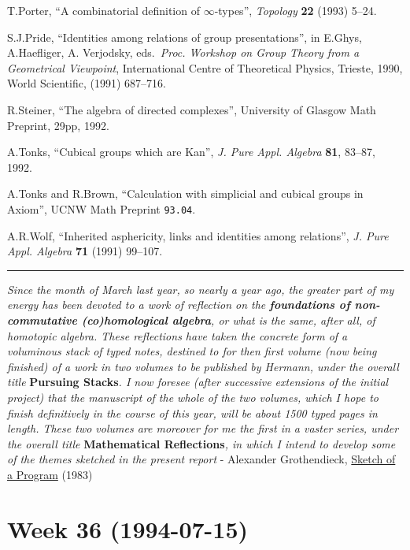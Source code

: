 \documentclass{article}
\begin{document}
\begin{enumerate}
  T.Porter, ``A combinatorial definition of \(\infty\)-types'',
  \emph{Topology} \textbf{22} (1993) 5--24.

  S.J.Pride, ``Identities among relations of group presentations'', in
  E.Ghys, A.Haefliger, A. Verjodsky, eds.~\emph{Proc. Workshop on Group
  Theory from a Geometrical Viewpoint}, International Centre of
  Theoretical Physics, Trieste, 1990, World Scientific, (1991) 687--716.

  R.Steiner, ``The algebra of directed complexes'', University of
  Glasgow Math Preprint, 29pp, 1992.

  A.Tonks, ``Cubical groups which are Kan'', \emph{J. Pure Appl.
  Algebra} \textbf{81}, 83--87, 1992.

  A.Tonks and R.Brown, ``Calculation with simplicial and cubical groups
  in Axiom'', UCNW Math Preprint \texttt{93.04}.

  A.R.Wolf, ``Inherited asphericity, links and identities among
  relations'', \emph{J. Pure Appl. Algebra} \textbf{71} (1991) 99--107.
\end{enumerate}

\begin{center}\rule{0.5\linewidth}{0.5pt}\end{center}

\emph{Since the month of March last year, so nearly a year ago, the
greater part of my energy has been devoted to a work of reflection on
the \textbf{foundations of non-commutative (co)homological algebra}, or
what is the same, after all, of homotopic algebra. These reflections
have taken the concrete form of a voluminous stack of typed notes,
destined to for then first volume (now being finished) of a work in two
volumes to be published by Hermann, under the overall title}
\textbf{Pursuing Stacks}\emph{. I now foresee (after successive
extensions of the initial project) that the manuscript of the whole of
the two volumes, which I hope to finish definitively in the course of
this year, will be about 1500 typed pages in length. These two volumes
are moreover for me the first in a vaster series, under the overall
title} \textbf{Mathematical Reflections}\emph{, in which I intend to
develop some of the themes sketched in the present report} - Alexander
Grothendieck, \href{http://www.grothendieckcircle.org/}{Sketch of a
Program} (1983)
\hypertarget{week-36-1994-07-15}{%
\section{Week 36 (1994-07-15)}\label{week-36-1994-07-15}}
\end{document}
